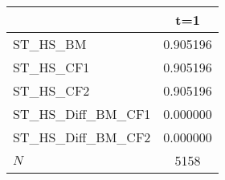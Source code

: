 {
\def\sym#1{\ifmmode^{#1}\else\(^{#1}\)\fi}
\begin{tabular}{l*{1}{c}}
\hline\hline
            &\multicolumn{1}{c}{t=1}\\
\hline
ST\_HS\_BM    &    0.905196\\
ST\_HS\_CF1   &    0.905196\\
ST\_HS\_CF2   &    0.905196\\
ST\_HS\_Diff\_BM\_CF1&    0.000000\\
ST\_HS\_Diff\_BM\_CF2&    0.000000\\
\hline
\(N\)       &        5158\\
\hline\hline
\end{tabular}
}

